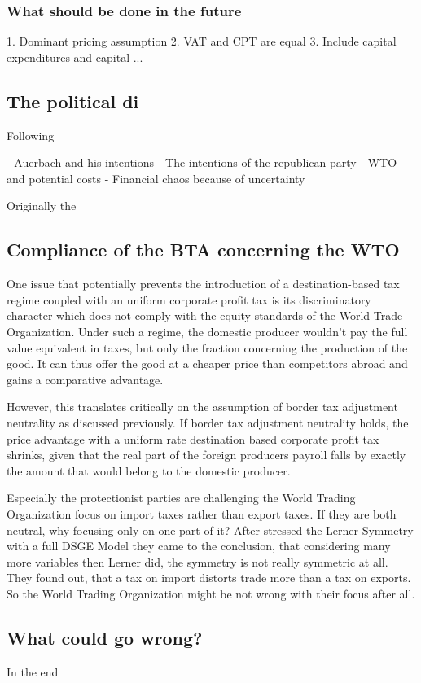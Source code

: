 \subsubsection{What should be done in the future}
1. Dominant pricing assumption
2. VAT and CPT are equal 
3. Include capital expenditures and capital ...


\subsection{The political di}
Following 

- Auerbach and his intentions 
- The intentions of the republican party 
- WTO and potential costs 
- Financial chaos because of uncertainty 

Originally the 



\subsection{Compliance of the BTA concerning the WTO}
One issue that potentially prevents the introduction of a destination-based tax regime coupled with an uniform corporate profit tax is its discriminatory character which does not comply with the equity standards of the World Trade Organization. Under such a regime, the domestic producer wouldn't pay the full value equivalent in taxes, but only the fraction concerning the production of the good. It can thus offer the good at a cheaper price than competitors abroad and gains a comparative advantage. 

However, this translates critically on the assumption of border tax adjustment neutrality as discussed previously. If border tax adjustment neutrality holds, the price advantage with a uniform rate destination based corporate profit tax shrinks, given that the real part of the foreign producers payroll falls by exactly the amount that would belong to the domestic producer. 

Especially the protectionist parties are challenging the World Trading Organization focus on import taxes rather than export taxes. If they are both neutral, why focusing only on one part of it? After \cite{barbiero2018macroeconomics} stressed the Lerner Symmetry with a full DSGE Model they came to the conclusion, that considering many more variables then Lerner did, the symmetry is not really symmetric at all. They found out, that a tax on import distorts trade more than a tax on exports. So the World Trading Organization might be not wrong with their focus after all.

\subsection{What could go wrong?}
In the end 